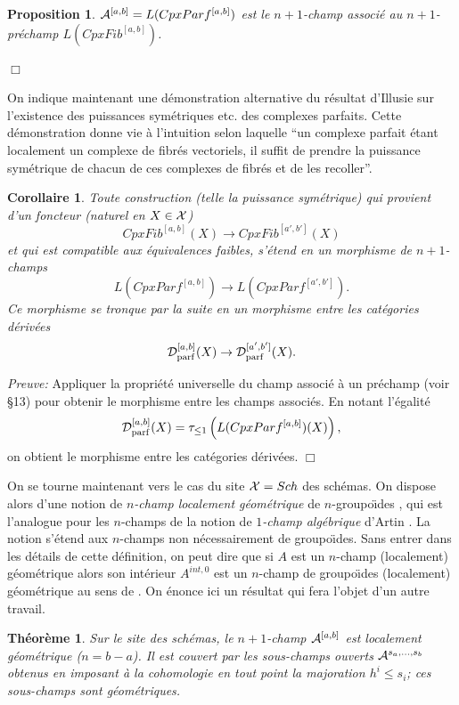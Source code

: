 \documentclass[12pt]{article}
\newcommand{\eop}{\hfill $\Box$\vspace{.1in}}
\newtheorem{proposition}[lemma]{Proposition}
\newtheorem{theoreme}[lemma]{Th\'eor\`eme}
\newtheorem{corollaire}[lemma]{Corollaire}
\newcommand{\Xx}{{\cal X}}
\begin{document}
\begin{proposition}
${\cal  A}^{[a,b]}=L(CpxParf^{[a,b]})$ est le $n+1$-champ associ\'e au
$n+1$-pr\'echamp $L(CpxFib^{[a,b]})$.
\end{proposition}
\eop

On indique maintenant une d\'emonstration alternative du r\'esultat d'Illusie
\cite{Illusie}
sur l'existence des puissances sym\'etriques etc. des complexes parfaits.  Cette
d\'emonstration
donne vie \`a l'intuition selon laquelle ``un complexe parfait
\'etant localement un
complexe de fibr\'es
vectoriels, il suffit de prendre la puissance sym\'etrique de chacun de ces
complexes de fibr\'es et de
les recoller''.

\begin{corollaire}
Toute construction (telle
la puissance sym\'etrique) qui provient d'un foncteur
(naturel en $X\in \Xx$)
$$
CpxFib^{[a,b]}(X) \rightarrow CpxFib^{[a',b']}(X)
$$
et qui est compatible aux \'equivalences faibles,
s'\'etend en un morphisme de $n+1$-champs
$$
L(CpxParf^{[a,b]})\rightarrow L(CpxParf^{[a',b']}).
$$
Ce morphisme se tronque par la suite en un morphisme entre les cat\'egories
d\'eriv\'ees
$$
{\cal D}^{[a,b]}_{\rm parf}(X)\rightarrow {\cal D}^{[a',b']}_{\rm parf}(X).
$$
\end{corollaire}
{\em Preuve:} Appliquer la propri\'et\'e universelle du champ associ\'e \`a un
pr\'echamp (voir \S 13) pour obtenir le morphisme entre les champs
associ\'es. En
notant l'\'egalit\'e
$$
{\cal D}^{[a,b]}_{\rm parf}(X)=\tau _{\leq 1} \left(
L(CpxParf^{[a,b]})(X)\right) ,
$$
on obtient le morphisme entre les cat\'egories d\'eriv\'ees.
\eop



On se tourne maintenant vers le cas du site $\Xx = Sch$ des sch\'emas.
On dispose alors d'une notion de {\em $n$-champ localement g\'eom\'etrique} de
$n$-groupo\"{\i}des \cite{geometricN}, qui est l'analogue pour les
$n$-champs de la
notion de {\em $1$-champ alg\'ebrique} d'Artin \cite{ArtinInventiones}. La
notion s'\'etend aux $n$-champs non n\'ecessairement de groupo\"{\i}des. Sans
entrer dans les d\'etails de cette d\'efinition, on peut dire que si $A$ est
un $n$-champ (localement) g\'eom\'etrique alors son int\'erieur $A^{int,
0}$ est
un $n$-champ de groupo\"{\i}des (localement) g\'eom\'etrique au sens de
\cite{geometricN}. On \'enonce ici un r\'esultat qui fera l'objet d'un autre
travail.

\begin{theoreme}
\label{modparfait}
Sur le site des sch\'emas,
le $n+1$-champ ${\cal  A}^{[a,b]}$ est localement g\'eom\'etrique ($n=b-a$).
Il est couvert par les sous-champs ouverts ${\cal  A}^{s_a,\ldots ,s_b}$
obtenus en imposant \`a la cohomologie en tout point la majoration $h^i \leq
s_i$;
ces sous-champs sont g\'eom\'etriques.
\end{theoreme}
\end{document}
